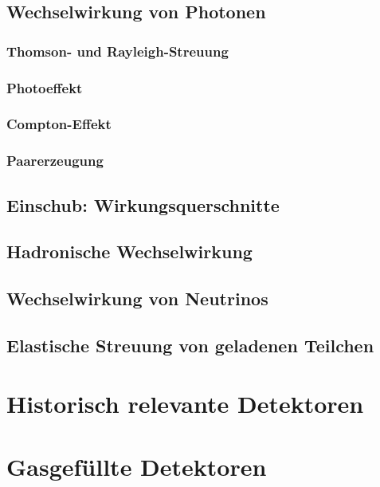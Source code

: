 \documentclass{article}
\begin{document}
\graphicspath{{bilder/1-2/}}
	\subsection{Wechselwirkung von Photonen}
		
			\subsubsection{Thomson- und Rayleigh-Streuung}\label{thomsonrayleigh} 
				
			\subsubsection{Photoeffekt}
				 
			\subsubsection{Compton-Effekt}
				
			\subsubsection{Paarerzeugung}
				
	\subsection{Einschub: Wirkungsquerschnitte}
		
				
\graphicspath{{bilder/1-345/}}
	\subsection{Hadronische Wechselwirkung}
		
	\subsection{Wechselwirkung von Neutrinos}
		
	\subsection{Elastische Streuung von geladenen Teilchen}
		
		
\section{Historisch relevante Detektoren}
\graphicspath{{bilder/2/}}
		
		
		
\section{Gasgefüllte Detektoren}
\graphicspath{{bilder/3/}}

\end{document}
